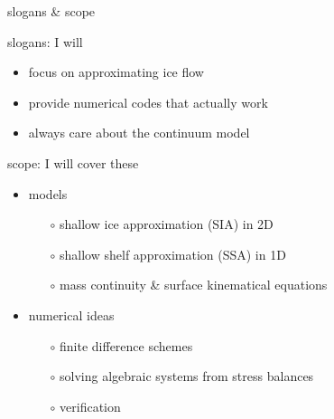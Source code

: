
\begin{frame}{slogans \& scope}

slogans: I will
  \begin{itemize}
  \item \alert{focus on approximating ice flow}
  \item \alert{provide numerical codes that actually work}
  \item \alert{always care about the continuum model}
  \end{itemize}
\medskip

scope: I will cover these
  \begin{itemize}
  \item models

    \begin{itemize}
    \item[$\circ$] shallow ice approximation (SIA) in 2D
    \item[$\circ$] shallow shelf approximation (SSA) in 1D
    \item[$\circ$] mass continuity \& surface kinematical equations
    \end{itemize}

  \item numerical ideas

    \begin{itemize}
    \item[$\circ$] finite difference schemes
    \item[$\circ$] solving algebraic systems from stress balances
    \item[$\circ$] verification
    \end{itemize}
  \end{itemize}
\end{frame}


\begin{comment}
\begin{frame}{outside of scope}

\large\emph{not} \normalsize covered here:\normalsize
\medskip

  \begin{itemize}
  \item Stokes and ``higher order'' flow equations
  \item thermomechanical coupling or polythermal ice
  \item subglacial hydrology/processes
  \item mass balance and snow/firn processes
  \item constitutive relations other than Glen isotropic
  \item grounding lines, calving fronts, ocean interaction
  \item paleo-climate and ``spin-up''
  \item earth deformation under ice sheet load
  \item other numerics: FEM, spectral, multigrid, parallel, \dots
  \item etc.
  \end{itemize}

\end{frame}
\end{comment}

